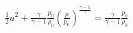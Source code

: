 \documentclass[10pt]{article}
\begin{document}
\begin{align*}\frac{1}{2} u^{2} + \frac{\gamma}{\gamma-1} \frac{p_0}{\rho_0} \left( \frac{p}{p_{0}} \right)^{\frac{\gamma-1}{\gamma} } = \frac{\gamma}{\gamma-1} \frac{p_{0}}{\rho_{0}}\end{align*}
\end{document}
